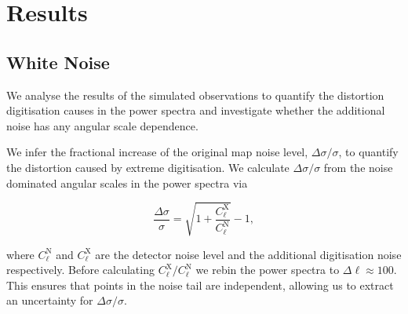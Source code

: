 \documentclass[apj]{emulateapj}
\begin{document}
\section{Results}
\label{sec:results}

\subsection{White Noise}
\label{subsec:whitenoise}

We analyse the results of the simulated observations to quantify the distortion digitisation causes in the power spectra and investigate whether the additional noise has any angular scale dependence.

We infer the fractional increase of the original map noise level, $\Delta \sigma / \sigma$, to quantify the distortion caused by extreme digitisation. We calculate $\Delta \sigma / \sigma$ from the noise dominated angular scales in the power spectra via

\begin{equation}
\frac{\Delta \sigma}{\sigma} = \sqrt{1 + \frac{C_\ell^\mathrm{X}}{C_\ell^{\mathrm{N}}}} - 1,
\end{equation}

where $C_\ell^{\mathrm{N}}$ and $C_\ell^\mathrm{X}$ are the detector noise level and the additional digitisation noise respectively. Before calculating $C_\ell^\mathrm{X}/C_\ell^\mathrm{N}$ we rebin the power spectra to $\Delta \ell \approx 100$. This ensures that points in the noise tail are independent, allowing us to extract an uncertainty for $\Delta \sigma / \sigma$.




\end{document}
